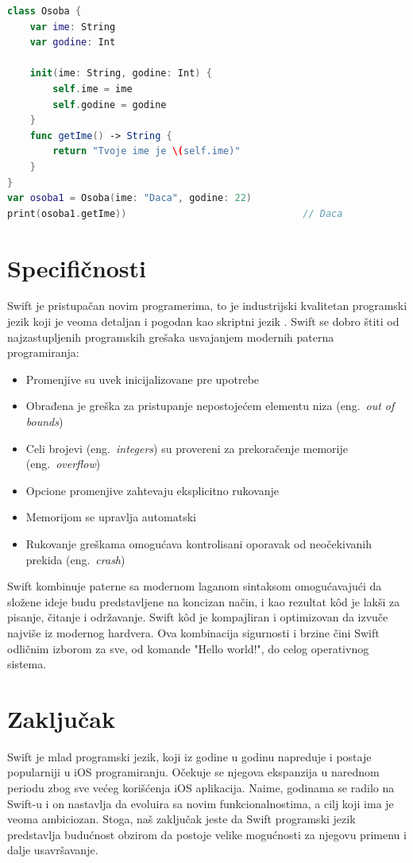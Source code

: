 \documentclass[a4paper]{article}
\begin{document}
\begin{lstlisting}[language=Swift, caption={Klasa},frame=single, label=simple]
class Osoba {
    var ime: String
    var godine: Int
    
    init(ime: String, godine: Int) {
        self.ime = ime
        self.godine = godine
    }
    func getIme() -> String {
        return "Tvoje ime je \(self.ime)"
	}
}
var osoba1 = Osoba(ime: "Daca", godine: 22)
print(osoba1.getIme))								// Daca
\end{lstlisting}

\section{Specifičnosti}	
\label{sec:osmiDeo}
Swift je pristupačan novim programerima, to je industrijski kvalitetan programski jezik koji je veoma detaljan i pogodan kao skriptni jezik \cite{swift_sajt}. Swift se dobro štiti od najzastupljenih programskih grešaka usvajanjem modernih paterna programiranja:
\begin{itemize}
\item Promenjive su uvek inicijalizovane pre upotrebe
\item Obrađena je greška za pristupanje nepostojećem elementu niza (eng.~{\em out of bounds})
\item Celi brojevi (eng.~{\em integers}) su provereni za prekoračenje memorije (eng.~{\em overflow})
\item Opcione promenjive zahtevaju eksplicitno rukovanje
\item Memorijom se upravlja automatski
\item Rukovanje greškama omogućava kontrolisani oporavak od neočekivanih prekida (eng.~{\em crash})
\end{itemize}

Swift kombinuje paterne sa modernom laganom sintaksom omogućavajući da složene ideje budu predstavljene na koncizan način, i kao rezultat k\^{o}d je lakši za pisanje, čitanje i održavanje. Swift k\^{o}d je kompajliran i optimizovan da izvuče najviše iz modernog hardvera. Ova kombinacija sigurnosti i brzine čini Swift odličnim izborom za sve, od komande "Hello world!", do celog operativnog sistema.

\section{Zaključak}
\label{sec:zakljucak}
Swift je mlad programski jezik, koji iz godine u godinu napreduje i postaje popularniji u iOS programiranju. Očekuje se njegova ekspanzija u narednom periodu zbog sve većeg korišćenja iOS aplikacija. Naime, godinama se radilo na Swift-u i on nastavlja da evoluira sa novim funkcionalnostima, a cilj koji ima je veoma ambiciozan. Stoga, naš zaključak jeste da Swift programski jezik predstavlja budućnost obzirom da postoje velike mogućnosti za njegovu primenu i dalje usavršavanje.

\appendix
 


\appendix
\end{document}
